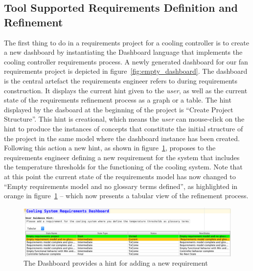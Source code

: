 \subsection*{Tool Supported Requirements Definition and Refinement}
\vspace{-.1cm}
The first thing to do in a requirements project for a cooling controller is to
create a new dashboard by instantiating the \textsf{Dashboard} language that
implements the cooling controller requirements process. A newly generated
dashboard for our fan requirements project is depicted in
figure~\ref{fig:empty_dashboard}.
The dashboard is the central artefact the requirements engineer refers to during
requirements construction. It displays the current hint given to the
\emph{user}, as well as the current state of the requirements refinement process
as a graph or a table. The hint displayed by the dasboard at the beginning of
the project is ``Create Project Structure''. This hint is creational, which
means the \emph{user} can mouse-click on the hint to produce the instances of
concepts that constitute the initial structure of the project in the same model
where the dashboard instance has been created. Following this action a new hint,
as shown in figure~\ref{fig:dashboard_newreq}, proposes to the requirements
engineer defining a new requirement for the system that includes the temperature
thresholds for the functioning of the cooling system.
Note that at this point the current state of the requirements model has now
changed to ``Empty requirements model and no glossary terms defined'', as
highlighted in orange in figure~\ref{fig:dashboard_newreq} -- which now presents
a tabular view of the refinement process.
\vspace{-.6cm}
\begin{figure}[!h]
\centering 
\includegraphics[width=1\textwidth]{./figures/DefineCoolingReq.png}
\vspace{-.7cm}
\caption{The Dashboard provides a hint for adding a new requirement}
\label{fig:dashboard_newreq}
\vspace{-.4cm}
\end{figure}

